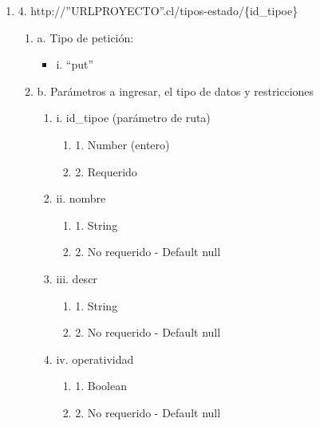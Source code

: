 \begin{enumerate}
    \item 4. http://”URLPROYECTO”.cl/tipos-estado/\{id\_tipoe\}
    \begin{enumerate}
        \item a. Tipo de petición:
            \begin{itemize}
               \item i. “put”
            \end{itemize}
        \item b. Parámetros a ingresar, el tipo de datos y restricciones
            \begin{enumerate}
                \item i. id\_tipoe (parámetro de ruta)
                    \begin{enumerate}
                        \item 1. Number (entero)
                        \item 2. Requerido
                    \end{enumerate}
                \item ii. nombre
                    \begin{enumerate}
                        \item 1. String
                        \item 2. No requerido - Default null
                    \end{enumerate}
                \item iii. descr
                    \begin{enumerate}
                        \item 1. String
                        \item 2. No requerido - Default null
                    \end{enumerate}
                \item iv. operatividad
                    \begin{enumerate}
                        \item 1. Boolean
                        \item 2. No requerido - Default null
                    \end{enumerate}
            \end{enumerate}
    \end{enumerate}


\end{enumerate}
